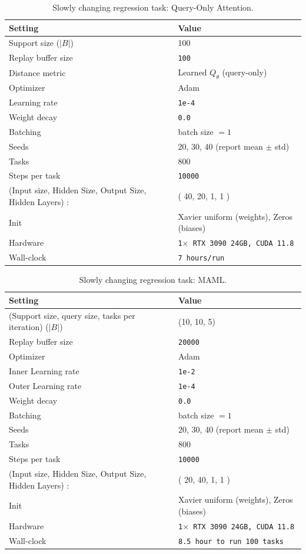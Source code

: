 \documentclass{article}
\begin{document}
 
\begin{table}[H]
\centering
\footnotesize
\caption{Slowly changing regression task: Query-Only Attention.}
\label{tab:scr_query_only_attention}
\begin{tabular}{@{}ll@{}}
\toprule
Setting & Value \\ \midrule
Support size ($|B|$) & 100 \\
Replay buffer size & \texttt{100} \\
Distance metric & Learned $Q_{\theta}$ (query-only) \\
Optimizer & Adam \\
Learning rate & \texttt{1e-4} \\
Weight decay & \texttt{0.0} \\
Batching &  batch size $=1$ \\
Seeds & 20, 30, 40 (report mean $\pm$ std) \\
Tasks & 800 \\
Steps per task & \texttt{10000} \\
(Input size, Hidden Size, Output Size, Hidden Layers) : & ( 40, 20, 1, 1 ) \\ 
Init & Xavier uniform (weights), Zeros (biases)\\
Hardware & \texttt{1$\times$ RTX 3090 24GB, CUDA 11.8} \\
Wall-clock & \texttt{7 hours/run} \\
\bottomrule
\end{tabular}
\end{table}

\begin{table}[H]
\centering
\footnotesize
\caption{Slowly changing regression task: MAML.}
\label{tab:scr_maml}
\begin{tabular}{@{}ll@{}}
\toprule
Setting & Value \\ \midrule
(Support size, query size, tasks per iteration) ($|B|$) & (10, 10, 5) \\
Replay buffer size & \texttt{20000} \\
Optimizer & Adam \\
Inner Learning rate & \texttt{1e-2} \\
Outer Learning rate & \texttt{1e-4} \\
Weight decay & \texttt{0.0} \\
Batching & batch size $=1$ \\
Seeds & 20, 30, 40 (report mean $\pm$ std) \\
Tasks & 800 \\
Steps per task & \texttt{10000} \\
(Input size, Hidden Size, Output Size, Hidden Layers) : & ( 20, 40, 1, 1 ) \\ 
Init & Xavier uniform (weights), Zeros (biases)\\
Hardware & \texttt{1$\times$ RTX 3090 24GB, CUDA 11.8} \\
Wall-clock & \texttt{8.5 hour to run 100 tasks} \\
\bottomrule
\end{tabular}
\end{table}
\end{document}
